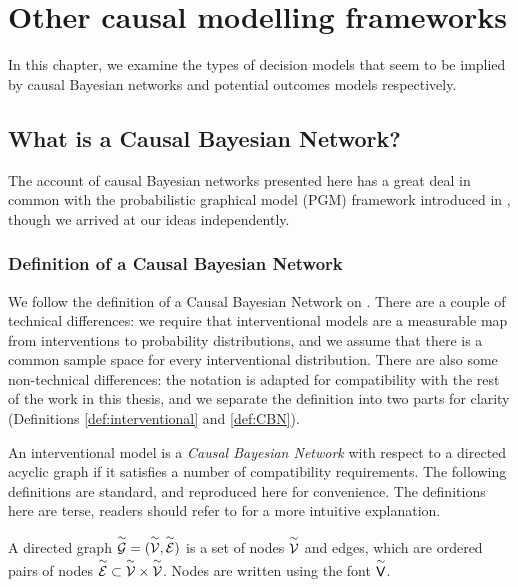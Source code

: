 
\chapter{Other causal modelling frameworks}\label{ch:other_causal_frameworks}

In this chapter, we examine the types of decision models that seem to be implied by causal Bayesian networks and potential outcomes models respectively. 

\section{What is a Causal Bayesian Network?}

The account of causal Bayesian networks presented here has a great deal in common with the probabilistic graphical model (PGM) framework introduced in \citet{lattimore_replacing_2019,lattimore_causal_2019}, though we arrived at our ideas independently. 

\subsection{Definition of a Causal Bayesian Network}

We follow the definition of a Causal Bayesian Network on \citet[page ~23-24]{pearl_causality:_2009}. There are a couple of technical differences: we require that interventional models are a measurable map from interventions to probability distributions, and we assume that there is a common sample space for every interventional distribution. There are also some non-technical differences: the notation is adapted for compatibility with the rest of the work in this thesis, and we separate the definition into two parts for clarity (Definitions \ref{def:interventional} and \ref{def:CBN}).

An interventional model is a \emph{Causal Bayesian Network} with respect to a directed acyclic graph if it satisfies a number of compatibility requirements. The following definitions are standard, and reproduced here for convenience. The definitions here are terse, readers should refer to \citet[chap. ~1]{pearl_causality:_2009} for a more intuitive explanation.

\begin{definition}
A directed graph $\overset{\sim}{\mathcal{G}}=(\overset{\sim}{\mathcal{V}},\overset{\sim}{\mathcal{E}})$ is a set of nodes $\overset{\sim}{\mathcal{V}}$ and edges, which are ordered pairs of nodes $\overset{\sim}{\mathcal{E}}\subset \overset{\sim}{\mathcal{V}}\times\overset{\sim}{\mathcal{V}}$. Nodes are written using the font $\overset{\sim}{\mathsf{V}}$.
\end{definition}

